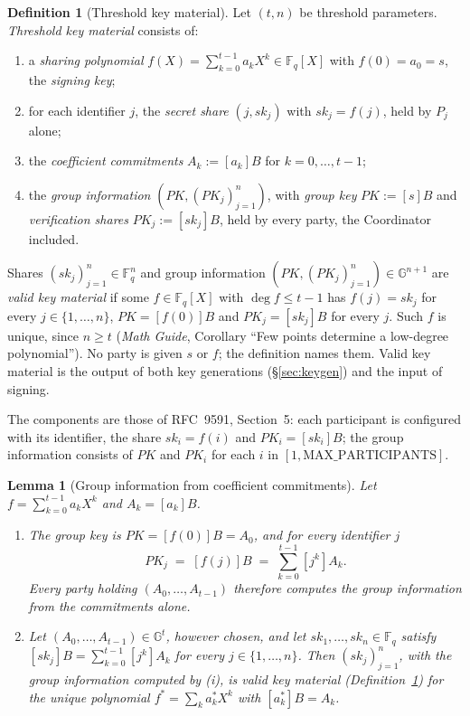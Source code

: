 \documentclass[11pt,a4paper]{article}
\newtheorem{lemma}[theorem]{Lemma}
\theoremstyle{definition}
\newtheorem{definition}[theorem]{Definition}
\newcommand{\F}{\mathbb{F}}
\newcommand{\G}{\mathbb{G}}
\newcommand{\Fq}{\F_q}
\begin{document}
\begin{definition}[Threshold key material]\label{def:key-material}
Let \((t, n)\) be threshold parameters. \emph{Threshold key material}
consists of:
\begin{enumerate}
\item a \emph{sharing polynomial}
  \(f(X) = \sum_{k=0}^{t-1} a_k X^k \in \Fq[X]\) with
  \(f(0) = a_0 = s\), the \emph{signing key};
\item for each identifier \(j\), the \emph{secret share}
  \((j, \mathit{sk}_j)\) with \(\mathit{sk}_j = f(j)\), held by \(P_j\)
  alone;
\item the \emph{coefficient commitments} \(A_k := [a_k]B\) for
  \(k = 0, \dots, t - 1\);
\item the \emph{group information}
  \((\mathit{PK}, (\mathit{PK}_j)_{j=1}^{n})\), with \emph{group key}
  \(\mathit{PK} := [s]B\) and \emph{verification shares}
  \(\mathit{PK}_j := [\mathit{sk}_j]B\), held by every party, the
  Coordinator included.
\end{enumerate}
Shares \((\mathit{sk}_j)_{j=1}^{n} \in \Fq^n\) and group information
\((\mathit{PK}, (\mathit{PK}_j)_{j=1}^{n}) \in \G^{n+1}\) are \emph{valid
key material} if some \(f \in \Fq[X]\) with \(\deg f \le t - 1\) has
\(f(j) = \mathit{sk}_j\) for every \(j \in \{1, \dots, n\}\),
\(\mathit{PK} = [f(0)]B\) and \(\mathit{PK}_j = [\mathit{sk}_j]B\) for
every \(j\). Such \(f\) is unique, since \(n \ge t\) (\emph{Math Guide},
Corollary ``Few points determine a low-degree polynomial''). No party is
given \(s\) or \(f\); the definition names them. Valid key material is the
output of both key generations (\S\ref{sec:keygen}) and the input of
signing.
\end{definition}

The components are those of RFC~9591, Section~5: each participant is
configured with its identifier, the share \(\mathit{sk}_i = f(i)\) and
\(\mathit{PK}_i = [\mathit{sk}_i]B\); the group information consists of
\(\mathit{PK}\) and \(\mathit{PK}_i\) for each \(i\) in
\([1, \mathrm{MAX\_PARTICIPANTS}]\).

\begin{lemma}[Group information from coefficient commitments]
\label{lem:group-info}
Let \(f = \sum_{k=0}^{t-1} a_k X^k\) and \(A_k = [a_k]B\).
\begin{enumerate}
\item[(i)] The group key is \(\mathit{PK} = [f(0)]B = A_0\), and for every
  identifier \(j\)
  \[
    \mathit{PK}_j \;=\; [f(j)]B \;=\; \sum_{k=0}^{t-1} [j^k] A_k .
  \]
  Every party holding \((A_0, \dots, A_{t-1})\) therefore computes the
  group information from the commitments alone.
\item[(ii)] Let \((A_0, \dots, A_{t-1}) \in \G^t\), however chosen, and let
  \(\mathit{sk}_1, \dots, \mathit{sk}_n \in \Fq\) satisfy
  \([\mathit{sk}_j]B = \sum_{k=0}^{t-1} [j^k] A_k\) for every
  \(j \in \{1, \dots, n\}\). Then \((\mathit{sk}_j)_{j=1}^{n}\), with the
  group information computed by (i), is valid key material
  (Definition~\ref{def:key-material}) for the unique polynomial
  \(f^{*} = \sum_{k} a^{*}_k X^k\) with \([a^{*}_k]B = A_k\).
\end{enumerate}
\end{lemma}
\end{document}
